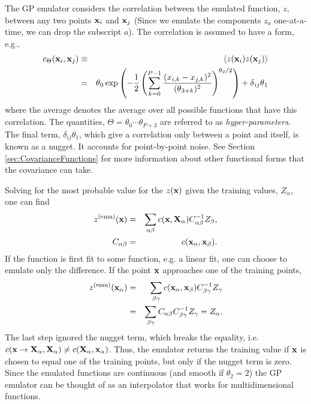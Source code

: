 The GP emulator considers the correlation between the emulated function, $z$, between any two points ${\bf x}_i$ and ${\bf x}_j$ (Since we emulate the components $z_a$ one-at-a-time, we can drop the subscript $a$). The correlation is assumed to have a form, e.g.,
\begin{eqnarray}
\label{eq:hyperform}
c_\Theta{}({\bf x}_i,{\bf x}_j)&\equiv&\langle z({\bf x}_i)z({\bf x}_j)\rangle\\
\nonumber
&=&
\theta{}_0
    \exp\left({ -\frac{1}{2}
        \left({
            \sum_{k=0}^{P-1}
                   \frac{(x_{i,k} - x_{j,k})^2}
                        {(\theta{}_{3+k})^2}
        }\right)^{\theta{}_2 / 2}
    }\right)
+ \delta{}_{ij}\theta{}_1
\end{eqnarray}
where the average denotes the average over all possible functions that have this correlation. The quantities, $\Theta = \theta_0\cdots\theta_{P+3}$ are referred to as {\it hyper-parameters}. The final term, $\delta_{ij}\theta_1$, which give a correlation only between a point and itself, is known as a nugget. It accounts for point-by-point noise.  See Section \ref{sec:CovarianceFunctions} for more information about other functional forms that the covariance can take.

Solving for the most probable value for the $z({\bf x})$ given the training values, $Z_\alpha$, one can find
\begin{eqnarray}
z^{\rm(emu)}({\bf x})&=&\sum_{\alpha\beta}c({\bf x},{\bf X}_\alpha) C^{-1}_{\alpha\beta}Z_\beta,\\
\nonumber
C_{\alpha\beta}&=&c({\bf x}_\alpha,{\bf x}_\beta).
\end{eqnarray}
If the function is first fit to some function, e.g. a linear fit, one can choose to emulate only the difference. If the point ${\bf x}$ approaches one of the training points,
\begin{eqnarray}
z^{\rm(emu)}({\bf x}_\alpha)&=&\sum_{\beta\gamma}c({\bf x}_\alpha,{\bf x}_\beta) C^{-1}_{\beta\gamma}Z_\gamma\\
\nonumber
&=&\sum_{\beta\gamma}C_{\alpha\beta}C^{-1}_{\beta\gamma}Z_\gamma=Z_\alpha.
\end{eqnarray}
The last step ignored the nugget term, which breaks the equality, i.e. $c({\bf x}\rightarrow {\bf X}_\alpha,{\bf X}_\alpha)\ne c({\bf X_{\alpha},{\bf x}_\alpha})$. Thus, the emulator returns the training value if ${\bf x}$ is chosen to equal one of the training points, but only if the nugget term is zero. Since the emulated functions are continuous (and smooth if $\theta_2=2$) the GP emulator can be thought of as an interpolator that works for multidimensional functions.

